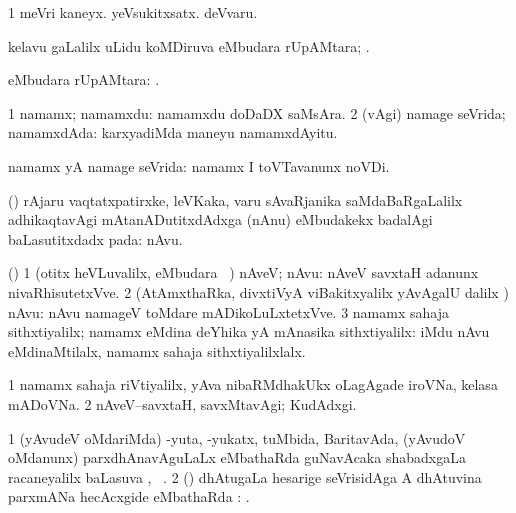 \noindent
\gl{\pagu}
\bmng
\bnum
\num{1}  meVri kaneyx. 
  
\banum
{} yeVsukitxsatx. 
 deVvaru. 
\eanum
\numie
\enum
\emng
\eentry

\bentry
{}
\gl{\uparx}
\bmng
kelavu \nA gaLalilx uLidu koMDiruva  eMbudara rUpAMtara; . 
\emng
\eentry

\bentry
{}
\gl{\uparx}
\bmng
{} eMbudara rUpAMtara: . 
\emng
\eentry

\bentry
{}
\bmng
\bnum
\num{1} namamx; namamxdu:  namamxdu doDaDX saMsAra. 
\num{2} (\Agu vAgi) namage seVrida; namamxdAda:  karxyadiMda maneyu namamxdAyitu. 
\enum
\emng

\noindent
\gl{\pagu}
\bmng
{} namamx yA namage seVrida:  namamx I toVTavanunx noVDi. 
\emng
\eentry

\bentry
{}
\gl{\sanA}
\expl{}
\bmng
(\pArxparx) rAjaru vaqtatxpatirxke, leVKaka, \mo varu sAvaRjanika saMdaBaRgaLalilx adhikaqtavAgi mAtanADutitxdAdxga  (nAnu) eMbudakekx badalAgi baLasutitxdadx pada: nAvu. 
\emng
\eentry

\bentry
{}
\gl{\sanA}
\expl{}
\bmng
(\bava) 
\bnum
\num{1} (otitx heVLuvalilx,  eMbudara \bava\ \rUpa) nAveV; nAvu:  nAveV savxtaH adanunx nivaRhisutetxVve. 
\num{2} (AtAmxthaRka, divxtiVyA viBakitxyalilx yAvAgalU \bava dalilx \parx) nAvu:  nAvu namageV toMdare mADikoLuLxtetxVve. 
\num{3} namamx sahaja sithxtiyalilx; namamx eMdina deYhika yA mAnasika sithxtiyalilx:  iMdu nAvu eMdinaMtilalx, namamx sahaja sithxtiyalilxlalx. 
\enum
\emng

\noindent
\gl{\pagu}
\bmng
\bnum
\num{1}  namamx sahaja riVtiyalilx, yAva nibaRMdhakUkx oLagAgade iroVNa, kelasa mADoVNa. 
\num{2}  nAveV--savxtaH, savxMtavAgi; KudAdxgi. 
\enum
\emng
\eentry

\bentry
{}
\gl{\uparx}
\bmng
\bnum
\num{1} (yAvudeV oMdariMda) -yuta, -yukatx, tuMbida, BaritavAda, (yAvudoV oMdanunx) parxdhAnavAguLaLx eMbathaRda guNavAcaka shabadxgaLa racaneyalilx baLasuva \uparx, \udA\ . 
\num{2} (\ravi) dhAtugaLa hesarige seVrisidAga A dhAtuvina parxmANa hecAcxgide eMbathaRda \uparx: . 
\enum
\emng
\eentry

